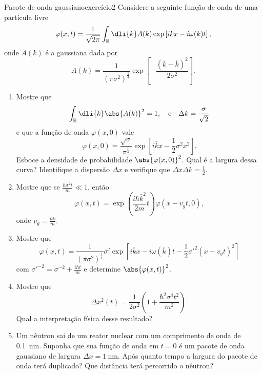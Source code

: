 \begin{exercício}{Pacote de onda gaussiano}{exercício2}
    Considere a seguinte função de onda de uma partícula livre
    \begin{equation*}
        \varphi(x,t) = \frac{1}{\sqrt{2\pi}} \int_{\mathbb{R}} \dli{k} A(k) \exp\left[ikx - i\omega(k) t\right],
    \end{equation*}
    onde \(A(k)\) é a gaussiana dada por
    \begin{equation*}
        A(k) = \frac{1}{(\pi \sigma^2)^{\frac14}} \exp\left[-\frac{(k - \bar{k})^2}{2 \sigma^2}\right].
    \end{equation*}
    \begin{enumerate}[label=(\alph*)]
        \item Mostre que
            \begin{equation*}
                \int_{\mathbb{R}} \dli{k} \abs{A(k)}^2 = 1, \quad\text{e}\quad \Delta k = \frac{\sigma}{\sqrt{2}}
            \end{equation*}
            e que a função de onda \(\varphi(x,0)\) vale
            \begin{equation*}
                \varphi(x,0) = \frac{\sqrt{\sigma}}{\pi^{\frac14}}\exp\left[i \bar{k} x - \frac12 \sigma^2 x^2\right].
            \end{equation*}
            Esboce a densidade de probabilidade \(\abs{\varphi(x,0)}^2\). Qual é a largura dessa curva? Identifique a dispersão \(\Delta x\) e verifique que \(\Delta x \Delta k = \frac12\).
        \item Mostre que se \(\frac{\hbar \sigma^2 t}{m} \ll 1\), então
            \begin{equation*}
                \varphi(x,t) = \exp\left(\frac{i\hbar \bar{k}^2}{2m}t\right)\varphi(x - v_gt, 0),
            \end{equation*}
            onde \(v_g = \frac{\hbar \bar{k}}{m}.\)
        \item Mostre que
            \begin{equation*}
                \varphi(x,t) = \frac{1}{(\pi \sigma^2)^{\frac14}} \sigma'\exp\left[i\bar{k}x - i \omega(\bar{k}) t  - \frac12 \sigma'^2 (x - v_gt)^2\right]
            \end{equation*}
            com \(\sigma'^{-2} = \sigma^{-2} + \frac{i \hbar t}{m}\) e determine \(\abs{\varphi(x,t)}^2\).
        \item Mostre que
            \begin{equation*}
                \Delta x^2(t) = \frac{1}{2\sigma^2}\left(1 + \frac{\hbar^2 \sigma^4 t^2}{m^2}\right).
            \end{equation*}
            Qual a interpretação física desse resultado?
        \item Um nêutron sai de um reator nuclear com um comprimento de onda de \SI{0.1}{\nano\meter}. Suponha que sua função de onda em \(t = 0\) é um pacote de onda gaussiano de largura \(\Delta x = \SI{1}{\nano\meter}.\) Após quanto tempo a largura do pacote de onda terá duplicado? Que distância terá percorrido o nêutron?
    \end{enumerate}
\end{exercício}
